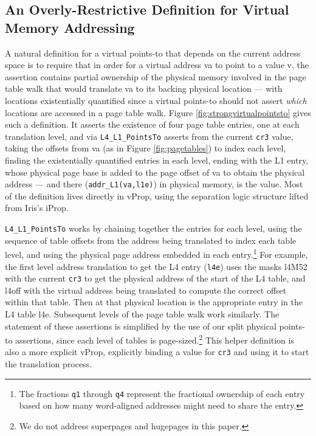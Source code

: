 \subsection{An Overly-Restrictive Definition for Virtual Memory Addressing}
\label{sec:overly-restrictive}
A natural definition for a virtual points-to that depends on the current address space is to
require that in order for a virtual address \textsf{va} to point to a value \textsf{v}, the assertion contains
partial ownership of the physical memory involved in the page table walk that would translate \textsf{va} to
its backing physical location --- with locations existentially quantified since a virtual points-to should not assert
\emph{which} locations are accessed in a page table walk.
Figure \ref{fig:strongvirtualpointsto} gives such a definition.
It asserts the existence of four page table entries, one at each translation level, and via \lstinline|L4_L1_PointsTo|
asserts from the current \lstinline|cr3| value, taking the offsets from \textsf{va} (as in Figure \ref{fig:pagetables})
to index each level, finding the existentially quantified entries in each level, 
ending with the L1 entry, whose physical page base is added to the page offset of \textsf{va} to obtain the physical address
 --- and there (\lstinline|addr_L1(va,l1e)|) in physical memory, is the value.
Most of the definition lives directly in \textsf{vProp}, using the separation logic structure lifted from Iris's \textsf{iProp}.

\lstinline|L4_L1_PointsTo| works by
chaining together the entries for each level, using the sequence of table offsets from the address being translated to index
each table level, and using the physical page address embedded in each entry.\footnote{
  The fractions \lstinline|q1| through \lstinline|q4| represent the fractional ownership of each entry based on how many
  word-aligned addresses might need to share the entry.
}
For example, 
  the first level address translation to get the L4 entry (\lstinline|l4e|) 
  uses the masks \textsf{l4M52} with the current \lstinline|cr3| to get the 
  physical address of the start of the L4 table,
  and \textsf{l4off} with the virtual address being translated to compute the correct offset within that table.
  Then at that physical location is the appropriate entry in the L4 table \textsf{l4e}.
  Subsequent levels of the page table walk work similarly.
The statement of these assertions is simplified by the use of our split physical points-to assertions, since
each level of tables is page-sized.\footnote{We do not address superpages and hugepages in this paper.}
This helper definition is also a more explicit \textsf{vProp}, explicitly binding a value for \lstinline|cr3| and using it
to start the translation process.


